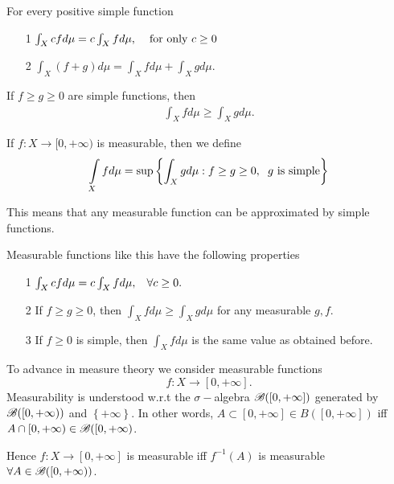 \begin{properties}
    For every positive simple function
    \begin{center}
\begin{itemize}
    \item[1] $\int_X cfd\mu = c\int_Xfd\mu,\hspace{4mm}\text{for only } c\geq 0$
    \item[2] $\int_X(f+g)d\mu = \int_Xfd\mu + \int_X gd\mu$.
\end{itemize}
\end{center}
\end{properties}

\begin{corollary}
    If $f\geq g\geq 0$ are simple functions, then 
    \begin{align*}
        \int_X fd\mu \geq \int_X g d\mu.
    \end{align*}
\end{corollary}

\begin{definition}
    If $f:X\rightarrow [0,+\infty)$ is measurable, then we define 
    \begin{align*}
        \int\limits_{X} fd\mu = \sup\left\{  \int_X gd\mu : f\geq g\geq 0,\hspace{2mm} g\text{ is simple}\right\}
    \end{align*}
\end{definition}
\begin{remark}
    This means that any measurable function can be approximated by simple functions.
\end{remark}

\begin{properties}
    Measurable functions like this have the following properties 
    \begin{itemize}
        \item[1] $\int_X cfd\mu = c\int_X fd\mu,\hspace{3mm} \forall c\geq 0. $
        \item[2] If $f\geq g\geq 0$, then $\int_X fd\mu\geq\int_X gd\mu$ for any measurable $g,f$.
        \item[3] If $f\geq 0$ is simple, then $\int_X fd\mu $ is the same value as obtained before.    
    \end{itemize}
\end{properties}

To advance in measure theory we consider measurable functions $$f:X\rightarrow [0,+\infty].$$ Measurability is understood w.r.t the $\sigma-$algebra
 $\mathscr{B}([0,+\infty])$ generated by $\mathscr{B}(\left[0,+\infty\right))$ and $\left\{+\infty\right\}$. In other words, $A\subset[0,+\infty]\in B([0,+\infty])$ iff $A\cap [0,+\infty)\in \mathscr{B}([0,+\infty)$.
\begin{remark}
    Hence $f:X\rightarrow [0,+\infty]$ is measurable iff $f^{-1}(A)$ is measurable $\forall A\in \mathscr{B}([0,+\infty))$.
\end{remark}

